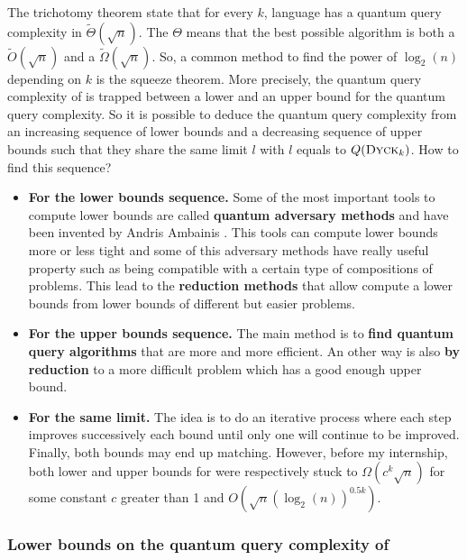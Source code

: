The trichotomy theorem state that for every $k$,  language has
a quantum query complexity in $\tilde{\Theta}(\sqrt{n})$. The $\Theta$
means that the best possible algorithm is both a $\tilde{O}(\sqrt{n})$
and a $\tilde{\Omega}(\sqrt{n})$. So, a common method to find the power
of $\log_2(n)$ depending on $k$ is the squeeze theorem. More precisely,
the quantum query complexity of  is trapped between a lower
and an upper bound for the quantum query complexity. So it is possible
to deduce the quantum query complexity from an increasing sequence of
lower bounds and a decreasing sequence of upper bounds such that they
share the same limit $l$ with $l$ equals to $Q(\textsc{Dyck$_{k}$})$. How to find
this sequence?
\begin{itemize}
    \item \textbf{For the lower bounds sequence.} Some of the most
          important tools to compute lower bounds are called
          \textbf{quantum adversary methods} and have been invented
          by Andris Ambainis \cite{andris_adversary_methode}. This
          tools can compute lower bounds more or less tight and some
          of this adversary methods have really useful property such
          as being compatible with a certain type of compositions
          of problems. This lead to the \textbf{reduction methods}
          that allow compute  a lower bounds from lower bounds of
          different but easier problems.
    \item \textbf{For the upper bounds sequence.} The main method
          is to \textbf{find quantum query algorithms} that are
          more and more efficient. An other way is also \textbf{by
              reduction} to a more difficult problem which has a good
          enough upper bound.
    \item \textbf{For the same limit.}
          The idea is to do an iterative process where each step
          improves successively each bound until only one will
          continue to be improved. Finally, both bounds may end
          up matching. However, before my internship, both lower
          and upper bounds for  were respectively stuck
          to $\Omega\left(c^k\sqrt{n}\right)$ for some
          constant $c$ greater than 1 and
          $O\left(\sqrt{n}\left(\log_2(n)\right)^{0.5k}\right)$.
\end{itemize}


\subsubsection{Lower bounds on the quantum query complexity of }

